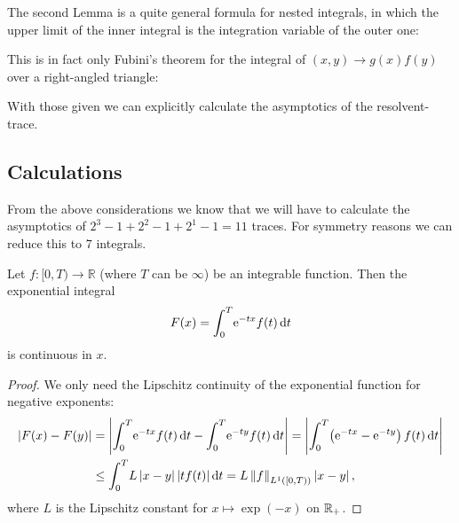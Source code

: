 The second Lemma is a quite general formula for nested integrals, in which the
upper limit of the inner integral is the integration variable of the outer one:

\begin{Remark}
  This is in fact only Fubini's theorem for the integral of $(x,y)\to g(x)f(y)$
  over a right-angled triangle:
  \begin{center}
  \end{center}
\end{Remark}

With those given we can explicitly calculate the asymptotics of the
resolvent-trace. 

\subsection{Calculations}
From the above considerations we know that we will have to calculate the
asymptotics of $2^3 - 1 + 2^2 - 1 + 2^1 - 1 = 11$ traces. For symmetry reasons
we can reduce this to 7 integrals.

\begin{Lemma}
  Let $f\colon [0,T)\to\mathbb{R}$ (where $T$ can be $\infty$) be an integrable
    function. Then the exponential integral
  \begin{align*}
    F(x) = \Integ[T]{0}{t}{\Eto{-tx} f(t)}
  \end{align*}
  is continuous in $x$.
  \begin{proof}
    We only need the Lipschitz continuity of the exponential function for
    negative exponents:
    \begin{align*}
      \lvert F(x) - F(y)\rvert &=
      \left|\Integ[T]{0}{t}{\Eto{-tx}f(t)} - \Integ[T]{0}{t}{\Eto{-ty}f(t)}\right|
      = \left|\Integ[T]{0}{t}{\left(\Eto{-tx}-\Eto{-ty}\right)f(t)}\right| \\
      &\le \Integ[T]{0}{t}{L\left|x - y\right| \lvert tf(t)\rvert}
      = L \left\|f\right\|_{L^1([0,T))} \left|x-y\right|,
    \end{align*}
    where $L$ is the Lipschitz constant for $x\mapsto\exp(-x)$ on $\Rplus$.
  \end{proof}
\end{Lemma}

